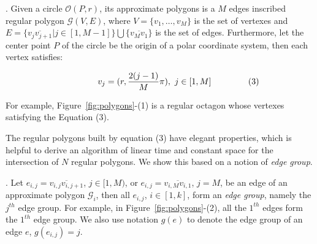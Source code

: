 .
Given a circle $\mathcal{O}(P, r)$, its approximate polygons is a $M$ edges inscribed regular polygon $\mathcal{G}(V, E)$,
where $V=\{v_1, \ldots, v_{M}\}$ is the set of vertexes and
$E= \{\overline{v_jv_{j+1}}| j\in [1,M-1]\} \bigcup \{\overline{v_Mv_1}\}$ is the set of edges.
Furthermore, let the center point $P$ of the circle be the origin of a polar coordinate system, then each vertex satisfies:

\vspace{-2ex}
\begin{equation*}
\label{equ-regular-polygon}
    \begin{aligned}
        \hspace{10ex}  v_j = (r, \frac{2(j-1)}{M}\pi), ~j \in [1, M]    \hspace{10ex} (3)\\
    \end{aligned}
\end{equation*}
\vspace{-1ex}


For example, Figure~\ref{fig:polygons}-(1) is a regular octagon whose vertexes satisfying the Equation (3).

The regular polygons built by equation (3) have elegant properties, which is helpful to derive an algorithm of linear time and constant space
for the intersection of $N$ regular polygons. We show this based on a notion of \emph{edge group}.


.
Let $e_{i,j} = \overline{v_{i,j}v_{i,j+1}}$, $j\in [1,M)$, or $e_{i,j} = \overline{v_{i,M}v_{i,1}}$, $j = M$, be an edge of an approximate polygon
$\mathcal{G}_i$, then all $e_{i,j}$, $i\in [1, k]$, form an \emph{edge group}, namely the $j^{th}$ edge group.
%
For example, in Figure~\ref{fig:polygons}-(2), all the $1^{th}$ edges form the $1^{th}$ edge group.
%
We also use notation $g(e)$ to denote the edge group of an edge $e$, \ie $g(e_{i,j})=j$.



